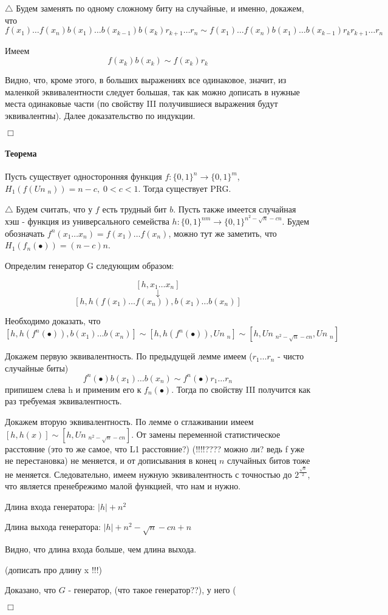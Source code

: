 \documentclass[12pt, a4paper]{article}
\newcommand{\uniform}{Un \;}
\newcommand{\bool}{\{0, 1\}}
\begin{document}
$\triangle$ Будем заменять по одному сложному биту на случайные, и именно, докажем, что 
$$f(x_1) \dots f(x_n) b(x_1) \dots b(x_{k - 1}) b(x_{k}) r_{k + 1} \dots r_{n} \sim f(x_1) \dots f(x_n) b(x_1) \dots b(x_{k - 1}) r_{k} r_{k + 1} \dots r_{n}$$

Имеем
$$f(x_k)b(x_k) \sim f(x_k) r_{k}$$

Видно, что, кроме этого, в больших выражениях все одинаковое, значит, из маленкой эквивалентности следует большая, так как можно дописать в нужные места одинаковые части (по свойству III получившиеся выражения будут эквивалентны). Далее доказательство по индукции.

$\Box$


\paragraph{Теорема} Пусть существует односторонняя функция $f:\bool^n \rightarrow \bool^m$, $H_1(f(\uniform_n)) = n - c, \; 0 < c < 1$. Тогда существует PRG.

$\triangle$ Будем считать, что у $f$ есть трудный бит $b$. Пусть также имеется случайная хэш - функция из универсального семейства $h : \bool^{nm} \rightarrow \bool^{n^2 - \sqrt{n} - cn}$. Будем обозначать $f^n(x_1 \dots x_n) = f(x_1) \dots f(x_n)$, можно тут же заметить, что $H_1(f_n(\bullet)) = (n-c)n$.

Определим генератор G следующим образом:

$$[h, x_1 \dots x_n]$$
$$\downarrow $$
$$[h, h(f(x_1) \dots f(x_n)), b(x_1) \dots b(x_n)]$$

Необходимо доказать, что
$$[h, h(f^n(\bullet)), b(x_1) \dots b(x_n)] \sim [h, h(f^n(\bullet)), \uniform_n] \sim [h, \uniform_{n^2 - \sqrt{n} - cn}, \uniform_n]$$

Докажем первую эквивалентность. По предыдущей лемме имеем ($r_1 \dots r_n$ - чисто случайные биты)
$$f^n(\bullet)b(x_1) \dots b(x_n) \sim f^n(\bullet) r_1 \dots r_n$$
припишем слева h и применим его к $f_n(\bullet)$. Тогда по свойству III получится как раз требуемая эквивалентность.

Докажем вторую эквивалентность. По лемме о сглаживании имеем $[h, h(x)] \sim [h, \uniform_{n^2 - \sqrt{n} - cn}]$. От замены переменной статистическое расстояние (это то же самое, что L1 расстояние?) (!!!!???? можно ли? ведь f уже не перестановка) не меняется, и от дописывания в конец $n$ случайных битов тоже не меняется. Следовательно, имеем нужную эквивалентность с точностью до $2^{\frac{\sqrt{n}}{2}}$, что является пренебрежимо малой функцией, что нам и нужно.

Длина входа генератора: $|h| + n^2$

Длина выхода генератора: $|h| + n^2 - \sqrt{n} - cn + n$

Видно, что длина входа больше, чем длина выхода.

(дописать про длину x !!!)

Доказано, что $G$ - генератор, (что такое генератор??), у него (

$\Box$
\end{document}
